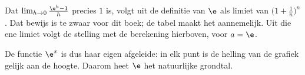 Dat $\lim_{h \to 0} \frac{\e^h - 1}{h}$ precies $1$ is, volgt uit de definitie van $\e$ als limiet van $\bigl(1 + \frac1n\bigr)^n$. Dat bewijs is te zwaar voor dit boek; de tabel maakt het aannemelijk. Uit die ene limiet volgt de stelling met de berekening hierboven, voor $a = \e$.

De functie $\e^x$ is dus haar eigen afgeleide: in elk punt is de helling van de grafiek gelijk aan de hoogte. Daarom heet $\e$ het natuurlijke grondtal.


\begin{oefeningen}
\end{oefeningen}

